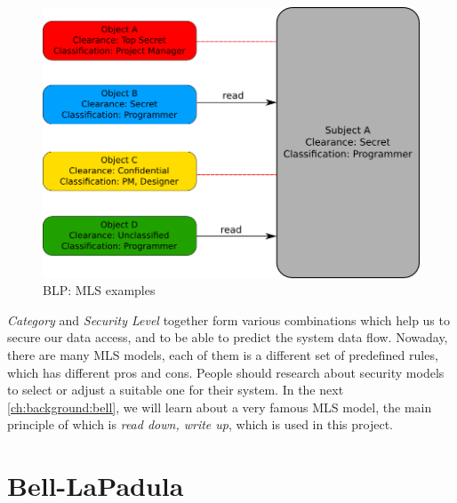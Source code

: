 \begin{figure}[bth]                                                                                                                                                  
\myfloatalign
\includegraphics[width=1.0\linewidth]{gfx/chapter_2/mls_example}
\caption[BLP: MLS examples]{BLP: MLS examples}\label{fig:mls_example}
\end{figure}

\emph{Category} and \emph{Security Level} together form various combinations which help us to secure our data access, and to be able to predict the system data flow.
Nowaday, there are many MLS models, each of them is a different set of predefined rules, which has different pros and cons.
People should research about security models to select or adjust a suitable one for their system. In the next \autoref{ch:background:bell}, we will learn about a very famous MLS model, the main principle of which is \emph{read down, write up}, which is used in this project.


\section{Bell-LaPadula}
\label{ch:background:bell}

